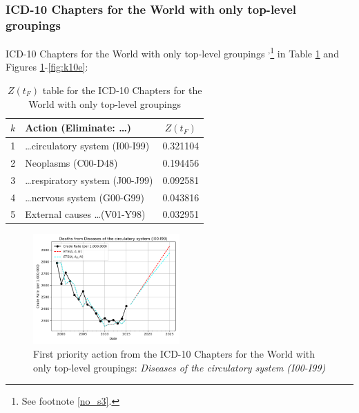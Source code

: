 \documentclass[10pt, a4paper, twocolumn]{IEEEconf}
\begin{document}
\clearpage

\subsubsection{ICD-10 Chapters for the World with only top-level groupings}

ICD-10 Chapters for the World with only top-level groupings \citep{whomortality}\textsuperscript{,}\footnote{See footnote \ref{no_s3}.} in Table \ref{table:ztable10} and Figures \ref{fig:k10a}-\ref{fig:k10e}:

\begin{table}[H]
  \centering
  \begin{tabular}{clc}
    \toprule
      $k$ & Action (Eliminate: \ldots) & $Z(t_F)$ \\
    \midrule
      1 &         \ldots circulatory system (I00-I99) & 0.321104 \\
      2 &                         Neoplasms (C00-D48) & 0.194456 \\
      3 &         \ldots respiratory system (J00-J99) & 0.092581 \\
      4 &             \ldots nervous system (G00-G99) & 0.043816 \\
      5 &            External causes \ldots (V01-Y98) & 0.032951 \\
    \bottomrule
  \end{tabular}
  \caption{$Z(t_F)$ table for the ICD-10 Chapters for the World with only top-level groupings}
  \label{table:ztable10}
\end{table}

\begin{figure}[H]
  \centering
  \includegraphics[width=0.5\textwidth]{results/WORLD_ICD10_CHAPTER_ROOTS/Diseases_of_the_circulatory_system_I00-I99_ets.png}
  \caption{First priority action from the ICD-10 Chapters for the World with only top-level groupings: \textit{Diseases of the circulatory system (I00-I99)}}\label{fig:k10a}
\end{figure}
\end{document}

